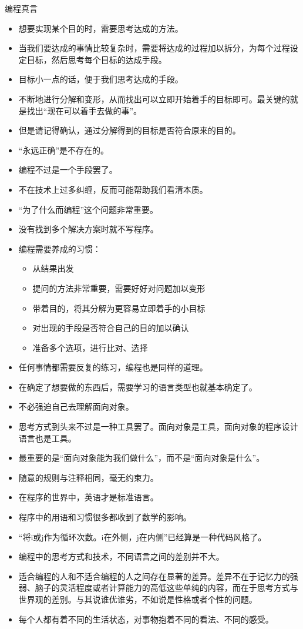 \begin{frame}
\begin{block}{编程真言}
\begin{itemize}
      \item 想要实现某个目的时，需要思考达成的方法。
      \item 当我们要达成的事情比较复杂时，需要将达成的过程加以拆分，为每个过程设定目标，然后思考每个目标的达成手段。
      \item 目标小一点的话，便于我们思考达成的手段。
      \item 不断地进行分解和变形，从而找出可以立即开始着手的目标即可。最关键的就是找出“现在可以着手去做的事”。
      \item 但是请记得确认，通过分解得到的目标是否符合原来的目的。
      \item “永远正确”是不存在的。
      \item 编程不过是一个手段罢了。
      \item 不在技术上过多纠缠，反而可能帮助我们看清本质。
      \item “为了什么而编程”这个问题非常重要。
      \item 没有找到多个解决方案时就不写程序。
      \item 编程需要养成的习惯：
        \begin{itemize}
          \item 从结果出发
          \item 提问的方法非常重要，需要好好对问题加以变形
          \item 带着目的，将其分解为更容易立即着手的小目标
          \item 对出现的手段是否符合自己的目的加以确认
          \item 准备多个选项，进行比对、选择
        \end{itemize}
      \item 任何事情都需要反复的练习，编程也是同样的道理。
      \item 在确定了想要做的东西后，需要学习的语言类型也就基本确定了。
      \item 不必强迫自己去理解面向对象。
      \item 思考方式到头来不过是一种工具罢了。面向对象是工具，面向对象的程序设计语言也是工具。
      \item 最重要的是“面向对象能为我们做什么”，而不是“面向对象是什么”。
      \item 随意的规则与注释相同，毫无约束力。
      \item 在程序的世界中，英语才是标准语言。
      \item 程序中的用语和习惯很多都收到了数学的影响。
      \item “将i或j作为循环次数。i在外侧，j在内侧”已经算是一种代码风格了。
      \item 编程中的思考方式和技术，不同语言之间的差别并不大。
      \item 适合编程的人和不适合编程的人之间存在显著的差异。差异不在于记忆力的强弱、脑子的灵活程度或者计算能力的高低这些单纯的内容，而在于思考方式与世界观的差别。与其说谁优谁劣，不如说是性格或者个性的问题。
      \item 每个人都有着不同的生活状态，对事物抱着不同的看法、不同的感受。
    \end{itemize}
  \end{block}
\end{frame}

